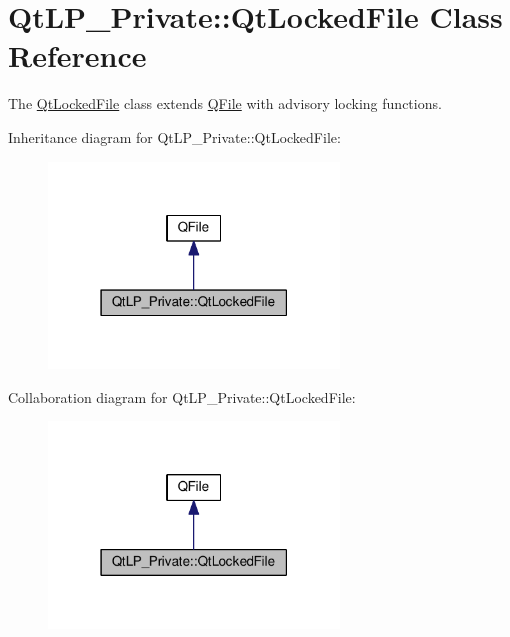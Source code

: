 \hypertarget{class_qt_l_p___private_1_1_qt_locked_file}{}\section{Qt\+L\+P\+\_\+\+Private\+:\+:Qt\+Locked\+File Class Reference}
\label{class_qt_l_p___private_1_1_qt_locked_file}


The \hyperlink{class_qt_l_p___private_1_1_qt_locked_file}{Qt\+Locked\+File} class extends \hyperlink{class_q_file}{Q\+File} with advisory locking functions.  




Inheritance diagram for Qt\+L\+P\+\_\+\+Private\+:\+:Qt\+Locked\+File\+:
\nopagebreak
\begin{figure}[H]
\begin{center}
\leavevmode
\includegraphics[width=219pt]{class_qt_l_p___private_1_1_qt_locked_file__inherit__graph}
\end{center}
\end{figure}


Collaboration diagram for Qt\+L\+P\+\_\+\+Private\+:\+:Qt\+Locked\+File\+:
\nopagebreak
\begin{figure}[H]
\begin{center}
\leavevmode
\includegraphics[width=219pt]{class_qt_l_p___private_1_1_qt_locked_file__coll__graph}
\end{center}
\end{figure}
